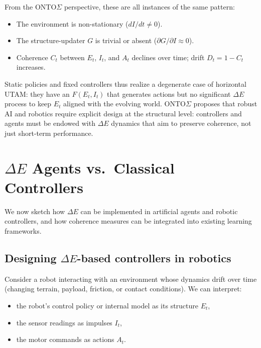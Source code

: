 \documentclass[12pt,a4paper]{report}
\begin{document}
From the ONTO$\Sigma$ perspective, these are all instances of the same pattern:

\begin{itemize}[leftmargin=2em]
    \item The environment is non-stationary (\(dI/dt \neq 0\)).
    \item The structure-updater \(G\) is trivial or absent (\(\partial G / \partial I \approx 0\)).
    \item Coherence \(C_t\) between \(E_t\), \(I_t\), and \(A_t\) declines over time; drift \(D_t = 1 - C_t\) increases.
\end{itemize}

Static policies and fixed controllers thus realize a degenerate case of horizontal UTAM: they have an \(F(E_t, I_t)\) that generates actions but no significant $\Delta E$ process to keep \(E_t\) aligned with the evolving world. ONTO$\Sigma$ proposes that robust AI and robotics require explicit design at the structural level: controllers and agents must be endowed with $\Delta E$ dynamics that aim to preserve coherence, not just short-term performance.

\section{\texorpdfstring{$\Delta E$}{ΔE} Agents vs.\ Classical Controllers}

We now sketch how $\Delta E$ can be implemented in artificial agents and robotic controllers, and how coherence measures can be integrated into existing learning frameworks.

\subsection*{Designing $\Delta E$-based controllers in robotics}

Consider a robot interacting with an environment whose dynamics drift over time (changing terrain, payload, friction, or contact conditions). We can interpret:

\begin{itemize}[leftmargin=2em]
    \item the robot's control policy or internal model as its structure \(E_t\),
    \item the sensor readings as impulses \(I_t\),
    \item the motor commands as actions \(A_t\).
\end{itemize}
\end{document}
